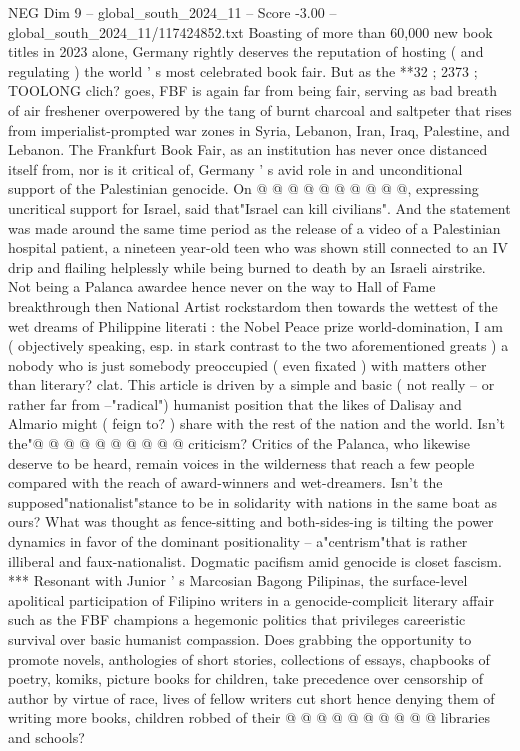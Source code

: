 \begin{textsample}{NEG Dim 9 – global\_south\_2024\_11 – Score -3.00 – global\_south\_2024\_11/117424852.txt}
Boasting of more than 60,000 new book titles in 2023 alone, Germany rightly deserves the reputation of hosting ( and regulating ) the world ' s most celebrated book fair.
But as the **32 ; 2373 ; TOOLONG clich? goes, FBF is again far from being fair, serving as bad breath of air freshener overpowered by the tang of burnt charcoal and saltpeter that rises from imperialist-prompted war zones in Syria, Lebanon, Iran, Iraq, Palestine, and Lebanon.
The Frankfurt Book Fair, as an institution has never once distanced itself from, nor is it critical of, Germany ' s avid role in and unconditional support of the Palestinian genocide.
On @ @ @ @ @ @ @ @ @ @, expressing uncritical support for Israel, said that"Israel can kill civilians".
And the statement was made around the same time period as the release of a video of a Palestinian hospital patient, a nineteen year-old teen who was shown still connected to an IV drip and flailing helplessly while being burned to death by an Israeli airstrike.
Not being a Palanca awardee hence never on the way to Hall of Fame breakthrough then National Artist rockstardom then towards the wettest of the wet dreams of Philippine literati : the Nobel Peace prize world-domination, I am ( objectively speaking, esp. in stark contrast to the two aforementioned greats ) a nobody who is just somebody preoccupied ( even fixated ) with matters other than literary? clat.
This article is driven by a simple and basic ( not really -- or rather far from --"radical") humanist position that the likes of Dalisay and Almario might ( feign to? ) share with the rest of the nation and the world.
Isn't the"@ @ @ @ @ @ @ @ @ @ criticism?
Critics of the Palanca, who likewise deserve to be heard, remain voices in the wilderness that reach a few people compared with the reach of award-winners and wet-dreamers.
Isn't the supposed"nationalist"stance to be in solidarity with nations in the same boat as ours?
What was thought as fence-sitting and both-sides-ing is tilting the power dynamics in favor of the dominant positionality -- a"centrism"that is rather illiberal and faux-nationalist.
Dogmatic pacifism amid genocide is closet fascism. *** Resonant with Junior ' s Marcosian Bagong Pilipinas, the surface-level apolitical participation of Filipino writers in a genocide-complicit literary affair such as the FBF champions a hegemonic politics that privileges careeristic survival over basic humanist compassion.
Does grabbing the opportunity to promote novels, anthologies of short stories, collections of essays, chapbooks of poetry, komiks, picture books for children, take precedence over censorship of author by virtue of race, lives of fellow writers cut short hence denying them of writing more books, children robbed of their @ @ @ @ @ @ @ @ @ @ libraries and schools?

\end{textsample}

